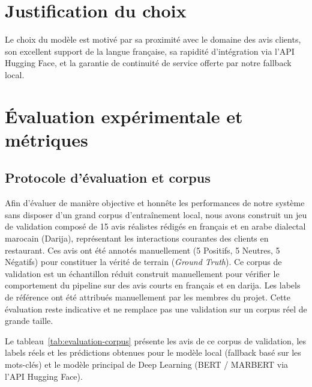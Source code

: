 \section{Justification du choix}
Le choix du modèle  est motivé par sa proximité avec le domaine des avis clients, son excellent support de la langue française, sa rapidité d'intégration via l'API Hugging Face, et la garantie de continuité de service offerte par notre fallback local.

\section{Évaluation expérimentale et métriques}
\label{sec:evaluation-sentiment}

\subsection{Protocole d'évaluation et corpus}
Afin d'évaluer de manière objective et honnête les performances de notre système sans disposer d'un grand corpus d'entraînement local, nous avons construit un jeu de validation composé de 15 avis réalistes rédigés en français et en arabe dialectal marocain (Darija), représentant les interactions courantes des clients en restaurant. Ces avis ont été annotés manuellement (5 Positifs, 5 Neutres, 5 Négatifs) pour constituer la vérité de terrain (\textit{Ground Truth}). Ce corpus de validation est un échantillon réduit construit manuellement pour vérifier le comportement du pipeline sur des avis courts en français et en darija. Les labels de référence ont été attribués manuellement par les membres du projet. Cette évaluation reste indicative et ne remplace pas une validation sur un corpus réel de grande taille.

Le tableau~\ref{tab:evaluation-corpus} présente les avis de ce corpus de validation, les labels réels et les prédictions obtenues pour le modèle local (fallback basé sur les mots-clés) et le modèle principal de Deep Learning (BERT / MARBERT via l'API Hugging Face).

